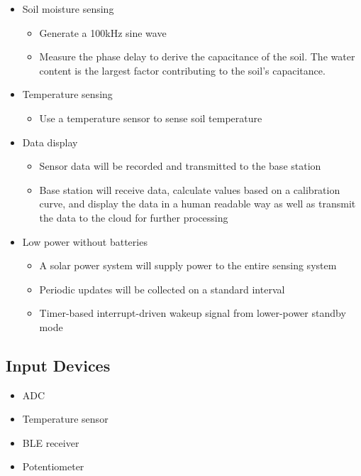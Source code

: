 \documentclass{article}
\begin{document}
\begin{itemize}
    \item Soil moisture sensing
        \begin{itemize}
            \item Generate a 100kHz sine wave
            \item Measure the phase delay to derive the capacitance of the
                soil.  The water content is the largest factor contributing to
                the soil's capacitance.
        \end{itemize}
    \item Temperature sensing
        \begin{itemize}
            \item Use a temperature sensor to sense soil temperature
        \end{itemize}
    \item Data display
        \begin{itemize}
            \item Sensor data will be recorded and transmitted to the base
                station
            \item Base station will receive data, calculate values based on a
                calibration curve, and display the data in a human readable way
                as well as transmit the data to the cloud for further
                processing
        \end{itemize}
    \item Low power without batteries
        \begin{itemize}
            \item A solar power system will supply power to the entire sensing
                system
            \item Periodic updates will be collected on a standard interval
            \item Timer-based interrupt-driven wakeup signal from lower-power
                standby mode
        \end{itemize}
\end{itemize}

\subsection{Input Devices}
\begin{itemize}
    \item ADC
    \item Temperature sensor
	\item BLE receiver
	\item Potentiometer
\end{itemize}
\end{document}
